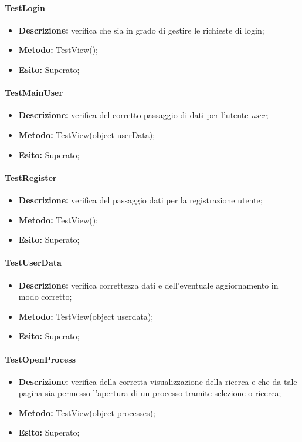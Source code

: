 \paragraph{TestLogin}
\begin{itemize}
\item \textbf{Descrizione:} verifica che sia in grado di gestire le richieste di login;
\item \textbf{Metodo:} TestView();
\item \textbf{Esito:} Superato;
\end{itemize}

\paragraph{TestMainUser}
\begin{itemize}
\item \textbf{Descrizione:} verifica del corretto passaggio di dati per l'utente \textit{user};
\item \textbf{Metodo:} TestView(object userData);
\item \textbf{Esito:} Superato;
\end{itemize}

\paragraph{TestRegister}
\begin{itemize}
\item \textbf{Descrizione:} verifica del passaggio dati per la registrazione utente;
\item \textbf{Metodo:} TestView();
\item \textbf{Esito:} Superato;
\end{itemize}

\paragraph{TestUserData}
\begin{itemize}
\item \textbf{Descrizione:} verifica correttezza dati e dell'eventuale aggiornamento in modo corretto;
\item \textbf{Metodo:} TestView(object userdata);
\item \textbf{Esito:} Superato;
\end{itemize}

\paragraph{TestOpenProcess}
\begin{itemize}
\item \textbf{Descrizione:} verifica della corretta visualizzazione della ricerca e che da tale pagina sia permesso l'apertura di un processo tramite selezione o ricerca;
\item \textbf{Metodo:} TestView(object processes);
\item \textbf{Esito:} Superato;
\end{itemize}

